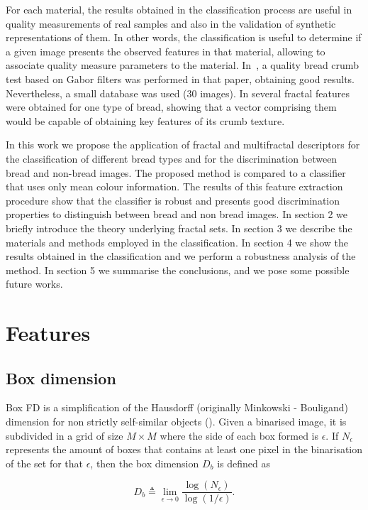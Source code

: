 \documentclass[oneside,a4paper,english,links]{amca}
\begin{document}
For each material, the results obtained in the classification process are useful in quality measurements of real samples and also in the validation of synthetic representations of them. In other words, the classification is useful to determine if a given image presents the observed features in that material, allowing to associate quality measure parameters to the material. In~\cite{Fan2006}, a quality bread crumb test based on Gabor filters was performed in that paper, obtaining good results. Nevertheless, a small database was used ($30$ images). In \cite{Gonzales2008} several fractal features were obtained for one type of bread, showing that a vector comprising them would be capable of obtaining key features of its crumb texture.

In this work we propose the application of fractal and multifractal descriptors for the classification of different bread types and for the discrimination between bread and non-bread images. The proposed method is compared to a classifier that uses only mean colour information. The results of this feature extraction procedure show that the classifier is robust and presents good discrimination properties to distinguish between bread and non bread images. In section 2 we briefly introduce the theory underlying fractal sets. In section 3 we describe the materials and methods employed in the classification. In section 4 we show the results obtained in the classification and we perform a robustness analysis of the method. In section 5 we summarise the conclusions, and we pose some possible future works.

\section{Features}
\subsection{Box dimension}
Box FD is a simplification of the Hausdorff (originally Minkowski - Bouligand) dimension for non strictly self-similar objects (\cite{Peitgen2004}). Given a binarised image, it is subdivided in a grid of size $M\times M$ where the side of each box formed is $\epsilon$. If $N_{\epsilon}$ represents the amount of boxes that contains at least one pixel in the binarisation of the set for that $\epsilon$, then the box dimension  $D_{b}$ is defined as

\begin{equation}
D_{b} \triangleq \displaystyle\lim_{\epsilon \to 0}{\frac{\log(N_{\epsilon})}{\log (1/\epsilon)}}.
\label{eqn:eqn1}
\end{equation}
\end{document}
